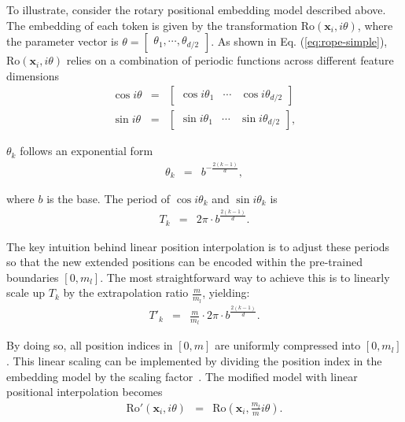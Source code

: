 To illustrate, consider the rotary positional embedding model described above. The embedding of each token is given by the transformation $\mathrm{Ro}(\mathbf{x}_i, i\theta)$, where the parameter vector is $\theta = \begin{bmatrix} \theta_1, \cdots, \theta_{d/2}\end{bmatrix}$. As shown in Eq. (\ref{eq:rope-simple}), $\mathrm{Ro}(\mathbf{x}_i, i\theta)$ relies on a combination of periodic functions across different feature dimensions
\begin{eqnarray}
\cos i\theta & = & \begin{bmatrix} \cos i\theta_1 & \cdots & \cos i\theta_{d/2} \end{bmatrix} \label{rope-cos-theta} \\
\sin i\theta & = & \begin{bmatrix} \sin i\theta_1 & \cdots & \sin i\theta_{d/2} \end{bmatrix} \label{rope-sin-theta},
\end{eqnarray}

\noindent $\theta_k$ follows an exponential form
\begin{eqnarray}
\theta_k & = & b^{-\frac{2(k-1)}{d}},
\end{eqnarray}

\noindent where $b$ is the base. The period of $\cos i\theta_k$ and $\sin i\theta_k$ is
\begin{eqnarray}
T_k & = & 2\pi \cdot b^{\frac{2(k-1)}{d}}.
\end{eqnarray}

The key intuition behind linear position interpolation is to adjust these periods so that the new extended positions can be encoded within the pre-trained boundaries $[0,m_l]$. The most straightforward way to achieve this is to linearly scale up $T_k$ by the extrapolation ratio $\frac{m}{m_l}$, yielding:
\begin{eqnarray}
T'_k & = & \frac{m}{m_l} \cdot 2\pi \cdot b^{\frac{2(k-1)}{d}}.
\end{eqnarray}

\noindent By doing so, all position indices in $[0, m]$ are uniformly compressed into $[0, m_l]$. This linear scaling can be implemented by dividing the position index in the embedding model by the scaling factor~\cite{chen-etal:2023extending}. The modified model with linear positional interpolation becomes
\begin{eqnarray}
\mathrm{Ro}'(\mathbf{x}_i,i\theta) & = & \mathrm{Ro} \left(\mathbf{x}_i,\frac{m_l}{m} i\theta \right).
\end{eqnarray}

